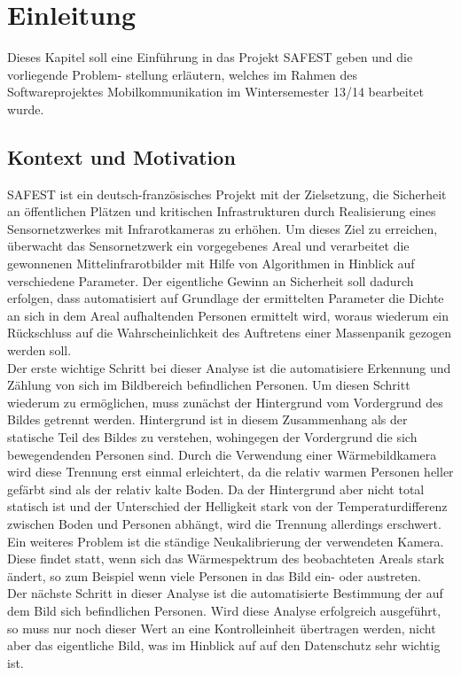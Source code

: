 \chapter{Einleitung}

Dieses Kapitel soll eine Einführung in das Projekt SAFEST geben und die vorliegende Problem- stellung erläutern, welches im Rahmen des Softwareprojektes Mobilkommunikation im Wintersemester 13/14 bearbeitet wurde.


\section{Kontext und Motivation}

SAFEST ist ein deutsch-französisches Projekt mit der Zielsetzung, die Sicherheit an öffentlichen Plätzen und kritischen Infrastrukturen durch Realisierung eines Sensornetzwerkes mit Infrarotkameras zu erhöhen.
 Um dieses Ziel zu erreichen, überwacht das Sensornetzwerk ein vorgegebenes Areal und verarbeitet die gewonnenen Mittelinfrarotbilder mit Hilfe von Algorithmen in Hinblick auf verschiedene Parameter.
 Der eigentliche Gewinn an Sicherheit soll dadurch erfolgen, dass automatisiert auf Grundlage der ermittelten Parameter die Dichte an sich in dem Areal aufhaltenden Personen ermittelt wird, woraus wiederum ein Rückschluss auf die Wahrscheinlichkeit des Auftretens einer Massenpanik gezogen werden soll.\\

Der erste wichtige Schritt bei dieser Analyse ist die automatisiere Erkennung und Zählung von sich im Bildbereich befindlichen Personen.
 Um diesen Schritt wiederum zu ermöglichen, muss zunächst der Hintergrund vom Vordergrund des Bildes getrennt werden.
 Hintergrund ist in diesem Zusammenhang als der statische Teil des Bildes zu verstehen, wohingegen der Vordergrund die sich bewegendenden Personen sind.
 Durch die Verwendung einer Wärmebildkamera wird diese Trennung erst einmal erleichtert, da die relativ warmen Personen heller gefärbt sind als der relativ kalte Boden.
 Da der Hintergrund aber nicht total statisch ist und der Unterschied der Helligkeit stark von der Temperaturdifferenz zwischen Boden und Personen abhängt, wird die Trennung allerdings erschwert.
 Ein weiteres Problem ist die ständige Neukalibrierung der verwendeten Kamera.
 Diese findet statt, wenn sich das Wärmespektrum des beobachteten Areals stark ändert, so zum Beispiel wenn viele Personen in das Bild ein- oder austreten.\\

Der nächste Schritt in dieser Analyse ist die automatisierte Bestimmung der auf dem Bild sich befindlichen Personen.
 Wird diese Analyse erfolgreich ausgeführt, so muss nur noch dieser Wert an eine Kontrolleinheit übertragen werden, nicht aber das eigentliche Bild, was im Hinblick auf auf den Datenschutz sehr wichtig ist.\\


